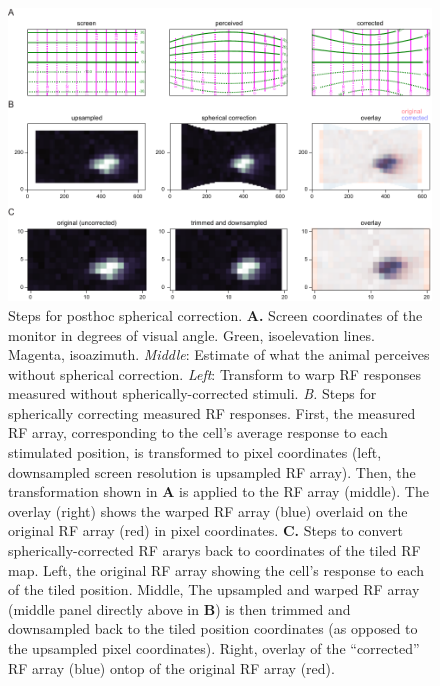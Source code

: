 \begin{figure}[t!]
\includegraphics[width=\textwidth]{figures/supplemental/fig_s8_spherical_correction_steps/fig_s8_spherical_correction_steps.pdf}
    \vspace{.1in}
    \caption[Spherical correction]{Steps for posthoc spherical correction.
    \textbf{A.} Screen coordinates of the monitor in degrees of visual angle. Green, isoelevation lines. Magenta, isoazimuth. \textit{Middle}: Estimate of what the animal perceives without spherical correction. \textit{Left}: Transform to warp RF responses measured without spherically-corrected stimuli. 
    \textit{B.} Steps for spherically correcting measured RF responses. First, the measured RF array, corresponding to the cell's average response to each stimulated position, is transformed to pixel coordinates (left, downsampled screen resolution is upsampled RF array). Then, the transformation shown in \textbf{A} is applied to the RF array (middle). The overlay (right) shows the warped RF array (blue) overlaid on the original RF array (red) in pixel coordinates.
    \textbf{C.} Steps to convert spherically-corrected RF ararys back to coordinates of the tiled RF map. Left, the original RF array showing the cell's response to each of the tiled position. Middle, The upsampled and warped RF array (middle panel directly above in \textbf{B}) is then trimmed and downsampled back to the tiled position coordinates (as opposed to the upsampled pixel coordinates). Right, overlay of the ``corrected'' RF array (blue) ontop of the original RF array (red).
    \label{supfig:spherical_correction_steps}}
\end{figure}

